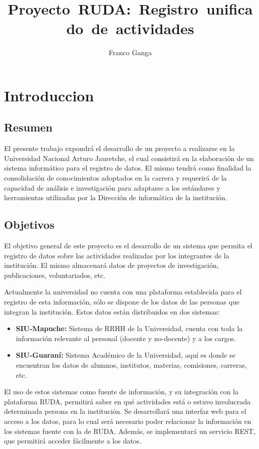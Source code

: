 \documentclass{article}
\author{Franco Ganga}
\title{Proyecto\ RUDA:\ Registro\ unificado\ de\ actividades}
\begin{document}
\maketitle

\section{Introduccion}%
\label{sec:introduccion}

\subsection{Resumen}%
\label{sub:resumen}

El presente trabajo expondrá el desarrollo de un proyecto a realizarse en la Universidad Nacional Arturo Jauretche, el cual consistirá en la elaboración de un sistema informático para el registro de datos\@. El mismo tendrá como finalidad la consolidación de conocimientos adoptados en la carrera y requerirá de la capacidad de análisis e investigación para adaptarse a los estándares y herramientas utilizadas por la Dirección de informática de la institución.

\subsection{Objetivos}%
\label{sub:objetivos}


El objetivo general de este proyecto es el desarrollo de un sistema que permita el registro de datos sobre las actividades realizadas por los integrantes de la institución. El mismo almacenará datos de proyectos de investigación, publicaciones, voluntariados, etc.

Actualmente la universidad no cuenta con una plataforma establecida para el registro de esta información, sólo se dispone de los datos de las personas que integran la institución. Estos datos están distribuidos en dos sistemas:
\begin{itemize}
    \item \textbf{SIU-Mapuche:} Sistema de RRHH de la Universidad, cuenta con toda la información relevante al personal (docente y no-docente) y a los cargos.
    \item \textbf{SIU-Guaraní:} Sistema Académico de la Universidad, aquí es donde se encuentran los datos de alumnos, institutos, materias, comisiones, carreras, etc.
\end{itemize}

El uso de estos sistemas como fuente de información, y su integración con la plataforma RUDA, permitirá saber en qué actividades está o estuvo involucrada determinada persona en la institución. Se desarrollará una interfaz web para el acceso a los datos, para lo cual será necesario poder relacionar la información en los sistemas fuente con la de RUDA\@. Además, se implementará un servicio REST, que permitirá acceder fácilmente a los datos.
\end{document}
